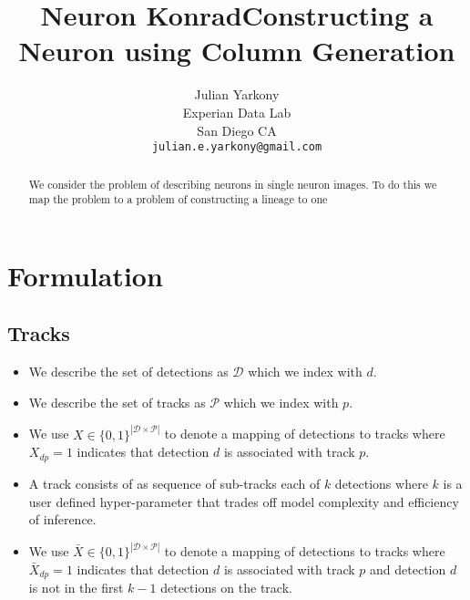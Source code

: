 \documentclass{article}
\title{Neuron Konrad}
\title{Constructing a Neuron using Column Generation}
\author{
Julian Yarkony\\
Experian Data Lab \\%
San Diego CA \\
\texttt{julian.e.yarkony@gmail.com} 
}
\begin{document}
%
\maketitle
%
\begin{abstract}
We consider the problem of describing neurons in single neuron images.  To do this we map the problem to a problem of constructing a lineage to one %
%
%
\end{abstract}

\section{Formulation}
\subsection{Tracks }

\begin{itemize}
\item
We describe the set of detections as $\mathcal{D}$ which we index with $d$.  
\item 
We describe the set of tracks as $\mathcal{P}$ which we index with $p$.  
\item 
We use $X \in \{0,1\}^{|\mathcal{D}\times \mathcal{P}|}$ to denote a mapping of detections to tracks where $X_{dp}=1$ indicates that detection $d$ is associated with track $p$.  
\item 
A track consists of as sequence of sub-tracks each of $k$ detections where $k$ is a user defined hyper-parameter that trades off model complexity and efficiency of inference. 
\item 
 We use $\bar{X} \in \{0,1\}^{|\mathcal{D}\times \mathcal{P}|}$ to denote a mapping of detections to tracks where $\bar{X}_{dp}=1$ indicates that detection $d$ is associated with track $p$ and detection $d$ is not in the first $k-1$ detections  on the track.

\end{itemize}
\end{document}
